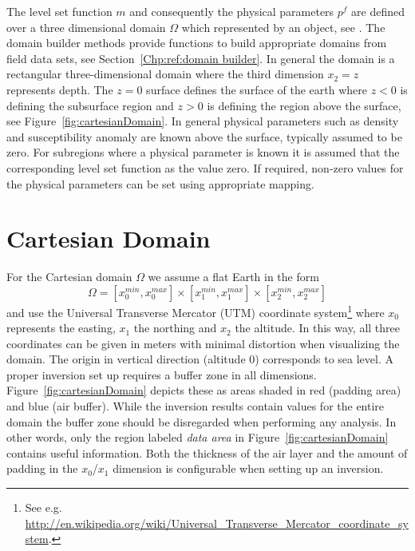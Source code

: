 The level set function $m$ and consequently the physical parameters $p^f$ are 
defined over a three dimensional domain $\Omega$ which represented by an \escript 
{} object, see \cite{ESCRIPT}. The domain builder methods provide 
functions to build appropriate domains from field data sets, see Section~\ref{Chp:ref:domain builder}.
In general the domain is a rectangular three-dimensional domain where the third dimension $x_2=z$ represents
depth. The $z=0$ surface defines the surface of the earth where $z<0$ is defining the subsurface region and
$z>0$ is defining the region above the surface, see Figure~\ref{fig:cartesianDomain}. In general physical parameters such as
density and susceptibility anomaly are known above the surface, typically assumed to be zero. 
For subregions where a physical parameter is known it is assumed that the corresponding level set function as 
the value zero. If required, non-zero values for the physical parameters can be set using appropriate mapping.      

\section{Cartesian Domain}
For the Cartesian domain $\Omega$ we assume a flat Earth in the form
\begin{equation} \label{REF:EQU:INTRO 8}
\Omega = [x^{min}_0, x^{max}_0] \times
 [x^{min}_1, x^{max}_1] \times
 [x^{min}_2, x^{max}_2] 
\end{equation} 
and use the Universal Transverse Mercator (UTM) coordinate system\footnote{See
    e.g. \url{http://en.wikipedia.org/wiki/Universal_Transverse_Mercator_coordinate_system}.}
where $x_0$ represents the easting, $x_1$ the northing and $x_2$ the altitude.
In this way, all three coordinates can be given in meters with minimal
distortion when visualizing the domain.
The origin in vertical direction (altitude 0) corresponds to sea level.
A proper inversion set up requires a buffer zone in all dimensions.
Figure~\ref{fig:cartesianDomain} depicts these as areas shaded in red (padding
area) and blue (air buffer).
While the inversion results contain values for the entire domain the buffer zone
should be disregarded when performing any analysis.
In other words, only the region labeled \emph{data area} in
Figure~\ref{fig:cartesianDomain} contains useful information.
Both the thickness of the air layer and the amount of padding in the $x_0$/$x_1$
dimension is configurable when setting up an inversion.

